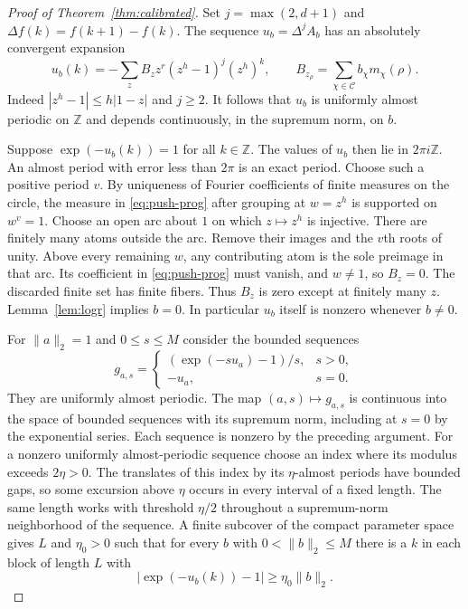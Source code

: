 \begin{proof}[Proof of Theorem~\ref{thm:calibrated}]
Set $j=\max(2,d+1)$ and $\Delta f(k)=f(k+1)-f(k)$.
The sequence $u_b=\Delta^j A_b$ has an absolutely convergent expansion
\begin{equation}
 u_b(k)=-\sum_z B_z z^r (z^h-1)^j(z^h)^k,\qquad
 B_{z_\rho}=\sum_{\chi\in\mathcal C}b_\chi m_\chi(\rho).
 \label{eq:push-prog}
\end{equation}
Indeed $|z^h-1|\le h|1-z|$ and $j\ge2$.
It follows that $u_b$ is uniformly almost periodic on $\mathbb Z$ and
depends continuously, in the supremum norm, on $b$.

Suppose $\exp(-u_b(k))=1$ for all $k\in\mathbb Z$.
The values of $u_b$ then lie in $2\pi i\mathbb Z$.
An almost period with error less than $2\pi$ is an exact period. Choose
such a positive period $v$. By uniqueness of Fourier coefficients of
finite measures on the circle, the measure in \eqref{eq:push-prog} after
grouping at $w=z^h$ is supported on $w^v=1$.
Choose an open arc about $1$ on which $z\mapsto z^h$ is injective.
There are finitely many atoms outside the arc. Remove their images and
the $v$th roots of unity. Above every remaining $w$, any contributing
atom is the sole preimage in that arc. Its coefficient in
\eqref{eq:push-prog} must vanish, and $w\ne1$, so $B_z=0$.
The discarded finite set has finite fibers. Thus $B_z$ is zero except
at finitely many $z$. Lemma~\ref{lem:logr} implies $b=0$.
In particular $u_b$ itself is nonzero whenever $b\ne0$.

For $\|a\|_2=1$ and $0\le s\le M$ consider the bounded sequences
\[
 g_{a,s}=
 \begin{cases}
  (\exp(-s u_a)-1)/s,& s>0,\\
  -u_a,&s=0.
 \end{cases}
\]
They are uniformly almost periodic. The map $(a,s)\mapsto g_{a,s}$ is
continuous into the space of bounded sequences with its supremum norm,
including at $s=0$ by the exponential series. Each sequence is nonzero
by the preceding argument. For a nonzero uniformly almost-periodic
sequence choose an index where its modulus exceeds $2\eta>0$.
The translates of this index by its $\eta$-almost periods have bounded
gaps, so some excursion above $\eta$ occurs in every interval of a
fixed length. The same length works with threshold $\eta/2$ throughout a
supremum-norm neighborhood of the sequence. A finite subcover of the compact
parameter space gives $L$ and $\eta_0>0$ such that for every $b$ with
$0<\|b\|_2\le M$ there is a $k$ in each block of length $L$ with
\begin{equation}
          |\exp(-u_b(k))-1|\ge\eta_0\|b\|_2 .
 \label{eq:recurrentdiff}
\end{equation}


\end{proof}
